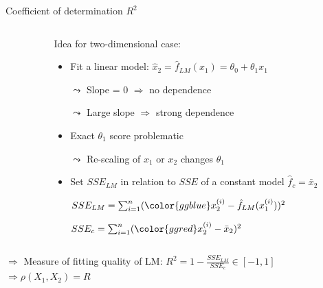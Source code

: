 \documentclass[11pt,compress,t,notes=noshow, aspectratio=169, xcolor=table]{beamer}
\begin{document}
\begin{frame}{Coefficient of determination $R^2$}
\begin{columns}[c, totalwidth=\textwidth]
\begin{column}{0.5\linewidth}
\end{column}
\begin{column}{0.5\linewidth}

\medskip

Idea for two-dimensional case:
\begin{itemize}
    \setlength\itemsep{0.7mm}
    \item Fit a linear model:
    $\hat{x}_2 = \hat{f}_{LM}(x_1) = \theta_0 + \theta_1 x_1$
    \item[$\leadsto$] Slope = $0$ $\Rightarrow$ no dependence
    \item[$\leadsto$] Large slope $\Rightarrow$ strong dependence
    \item Exact $\theta_1$ score problematic 
    \pause
    \item[$\leadsto$] Re-scaling of $x_1$ or $x_2$ changes $\theta_1$ 
    \pause
    \item Set $SSE_{LM}$ in relation to $SSE$ of a constant model $\hat{f}_c = \bar{x}_2$
    \item[] $SSE_{LM} = \sum_{i=1}^n ({\color{ggblue}x_2^{(i)} - \hat{f}_{LM}(x_1^{(i)})})^2$
    \item[] $SSE_{c} = \sum_{i=1}^n ({\color{ggred}x_2^{(i)} - \bar{x}_2})^2$
\end{itemize}

\end{column}
\end{columns}

\medskip

$\Rightarrow$ Measure of fitting quality of LM: $R^2 = 1-\frac{SSE_{LM}}{SSE_{c}} \in [-1, 1]$ \\
$\Rightarrow \rho(X_1, X_2) = R$

\end{frame}
\end{document}
